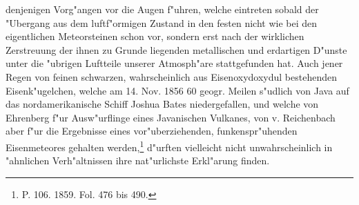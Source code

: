 \documentclass[a4paper, 8pt, oneside, polutonikogreek, german]{article}
\begin{document}
denjenigen Vorg"angen vor die Augen f"uhren, welche eintreten sobald der "Ubergang aus dem luftf"ormigen Zustand in den festen nicht wie bei den eigentlichen Meteorsteinen schon vor, sondern erst nach der wirklichen Zerstreuung der ihnen zu Grunde liegenden metallischen und erdartigen D"unste unter die "ubrigen Luftteile unserer Atmosph"are stattgefunden hat. Auch jener Regen von feinen schwarzen, wahrscheinlich aus Eisenoxydoxydul bestehenden Eisenk"ugelchen, welche am 14. Nov. 1856 60 geogr. Meilen s"udlich von Java auf das nordamerikanische Schiff Joshua Bates niedergefallen, und welche von Ehrenberg f"ur Ausw"urflinge eines Javanischen Vulkanes, von v. Reichenbach aber f"ur die Ergebnisse eines vor"uberziehenden, funkenspr"uhenden Eisenmeteores gehalten werden,\footnote{P. 106. 1859. Fol. 476 bis 490.} d"urften vielleicht nicht unwahrscheinlich in "ahnlichen Verh"altnissen ihre nat"urlichste Erkl"arung finden.
\end{document}
